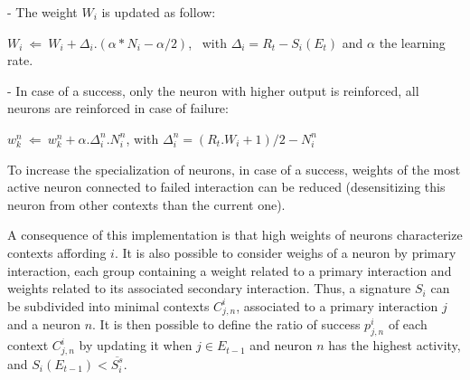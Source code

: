 \documentclass[conference]{IEEEtran}
\begin{document}
- The weight $W_i$ is updated as follow:

$W_i ~\Leftarrow~ W_i+ \Delta_i . (\alpha * N_i - \alpha /2)$, ~with $\Delta_i=R_t-S_i(E_t)$
and $\alpha$ the learning rate.

- In case of a success, only the neuron with higher output is reinforced, all neurons are reinforced in case of failure:

$w_k^n ~\Leftarrow~ w_k^n+ \alpha . \Delta_i^n . N_i^n$,
with $\Delta_i^n=(R_t.W_i + 1)/2 - N_i^n$


To increase the specialization of neurons, in case of a success, weights of the most active neuron connected to failed interaction can be reduced (desensitizing this neuron from other contexts than the current one). %


A consequence of this implementation is that high weights of neurons characterize contexts affording $i$. It is also possible to consider weighs of a neuron by primary interaction, each group containing a weight related to a primary interaction and weights related to its associated secondary interaction. Thus, a signature $S_i$ can be subdivided into minimal contexts $C_{j,n}^i$, associated to a primary interaction $j$ and a neuron $n$. It is then possible to define the ratio of success $p_{j,n}^i$ %
of each context $C_{j,n}^i$ by updating it when $j \in E_{t-1}$ and neuron $n$ has the highest activity, and $S_i(E_{t-1})<\overline{S_i^s}$.%
\end{document}
